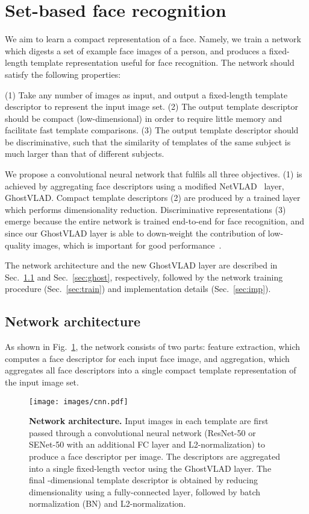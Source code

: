\documentclass[runningheads]{llncs}
\begin{document}
\section{Set-based face recognition}
\label{sec:cnn}
We aim to learn a compact representation of a face.
Namely, we train a network which digests a set of example face images of
a person, and produces a fixed-length template representation
useful for face recognition.
The network should satisfy the following properties:

(1) Take any number of images as input, and output a 
fixed-length template descriptor to represent the 
input image set.
(2) The output template descriptor should be compact
(\ie low-dimensional) in order to require little memory
and facilitate fast template comparisons.
(3) The output template descriptor should be 
discriminative, such that the similarity of
templates of the same subject is much larger than that
of different subjects.

We propose a convolutional neural 
network that fulfils all three objectives.
(1) is achieved by aggregating face descriptors
using a modified NetVLAD~\cite{Arandjelovic16} layer, GhostVLAD.
Compact template descriptors (2) are produced by a
trained layer which performs dimensionality reduction.
Discriminative representations (3) emerge because
the entire network is trained end-to-end for face recognition,
and since our GhostVLAD layer is able to
down-weight the contribution of low-quality images,
which is important for good
performance~\cite{Goswami14,Yang17,Hassner16}.

The network architecture and the new GhostVLAD layer
are described
in Sec.~\ref{sec:arch} and Sec.~\ref{sec:ghost}, respectively,
followed by 
the network training procedure (Sec.~\ref{sec:train})
and implementation 
details (Sec.~\ref{sec:imp}).


\subsection{Network architecture}
\label{sec:arch}
As shown in Fig.~\ref{fig:cnn},
the network consists of two parts:
feature extraction, which computes a 
face descriptor for each input face image, and 
aggregation, which aggregates all face descriptors
into a single compact template representation of
the input image set.

\begin{figure}[t]
   \begin{center}
         \texttt{[image: images/cnn.pdf]}
   \end{center}
   \caption{\textbf{Network architecture.}
Input images in each template are first 
passed through a convolutional 
neural network (\eg ResNet-50 or SENet-50 with an additional
FC layer and L2-normalization) to produce 
a face descriptor per image.
The descriptors are aggregated into a single fixed-length
vector using the GhostVLAD layer.
The final -dimensional template descriptor
is obtained by reducing dimensionality using a fully-connected layer,
followed by batch normalization (BN) and
L2-normalization.
   }
    \label{fig:cnn}
\end{figure}
\end{document}
